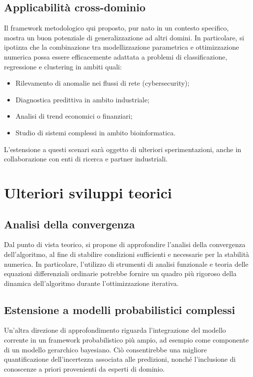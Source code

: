\documentclass[a4paper,12pt]{report}
\theoremstyle{plain}
\begin{document}
\subsection{Applicabilità cross-dominio}
Il framework metodologico qui proposto, pur nato in un contesto specifico, mostra un buon potenziale di generalizzazione ad altri domini. In particolare, si ipotizza che la combinazione tra modellizzazione parametrica e ottimizzazione numerica possa essere efficacemente adattata a problemi di classificazione, regressione e clustering in ambiti quali:
\begin{itemize}
  \item Rilevamento di anomalie nei flussi di rete (cybersecurity);
  \item Diagnostica predittiva in ambito industriale;
  \item Analisi di trend economici o finanziari;
  \item Studio di sistemi complessi in ambito bioinformatica.
\end{itemize}
L'estensione a questi scenari sarà oggetto di ulteriori sperimentazioni, anche in collaborazione con enti di ricerca e partner industriali.
\section{Ulteriori sviluppi teorici}
\subsection{Analisi della convergenza}
Dal punto di vista teorico, si propone di approfondire l'analisi della convergenza dell'algoritmo, al fine di stabilire condizioni sufficienti e necessarie per la stabilità numerica. In particolare, l'utilizzo di strumenti di analisi funzionale e teoria delle equazioni differenziali ordinarie potrebbe fornire un quadro più rigoroso della dinamica dell'algoritmo durante l'ottimizzazione iterativa.
\subsection{Estensione a modelli probabilistici complessi}
Un'altra direzione di approfondimento riguarda l'integrazione del modello corrente in un framework probabilistico più ampio, ad esempio come componente di un modello gerarchico bayesiano. Ciò consentirebbe una migliore quantificazione dell'incertezza associata alle predizioni, nonché l'inclusione di conoscenze a priori provenienti da esperti di dominio.
\end{document}
